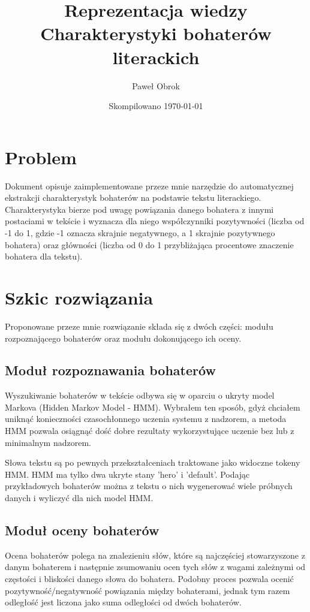 \documentclass[10pt,a4paper]{article}
\title{Reprezentacja wiedzy\\ Charakterystyki bohaterów literackich}
\author{Paweł Obrok}
\date{Skompilowano \today}
\begin{document}
\maketitle

\section{Problem}

	Dokument opisuje zaimplementowane przeze mnie narzędzie do automatycznej ekstrakcji charakterystyk bohaterów na podstawie tekstu literackiego. Charakterystyka bierze pod uwagę powiązania danego bohatera z innymi postaciami w tekście i wyznacza dla niego współczynniki pozytywności (liczba od -1 do 1, gdzie -1 oznacza skrajnie negatywnego, a 1 skrajnie pozytywnego bohatera) oraz główności (liczba od 0 do 1 przybliżająca procentowe znaczenie bohatera dla tekstu).

\section{Szkic rozwiązania}

	Proponowane przeze mnie rozwiązanie składa się z dwóch części: modułu rozpoznającego bohaterów oraz modułu dokonującego ich oceny.

	\subsection{Moduł rozpoznawania bohaterów}

		Wyszukiwanie bohaterów w tekście odbywa się w oparciu o ukryty model Markova (Hidden Markov Model - HMM). Wybrałem ten sposób, gdyż chciałem uniknąć konieczności czasochłonnego uczenia systemu z nadzorem, a metoda HMM pozwala osiągnąć dość dobre rezultaty wykorzystujące uczenie bez lub z minimalnym nadzorem.

		Słowa tekstu są po pewnych przekształceniach traktowane jako widoczne tokeny HMM. HMM ma tylko dwa ukryte stany 'hero' i 'default'. Podając przykładowych bohaterów można z tekstu o nich wygenerować wiele próbnych danych i wyliczyć dla nich model HMM.

	\subsection{Moduł oceny bohaterów}

		Ocena bohaterów polega na znalezieniu słów, które są najczęściej stowarzyszone z danym bohaterem i następnie zsumowaniu ocen tych słów z wagami zależnymi od częstości i bliskości danego słowa do bohatera. Podobny proces pozwala ocenić pozytywność/negatywność powiązania między bohaterami, jednak tym razem odległość jest liczona jako suma odległości od dwóch bohaterów.
\end{document}
